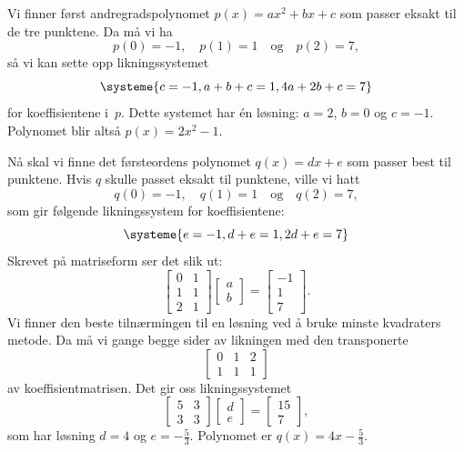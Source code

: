 \documentclass[notitlepage,a4paper,12pt,norsk]{IMFeksamen}
\newcommand{\0}{\V{0}}
\newcommand{\oppgslutt}{
\begin{center}
\pgfornament[width=6cm]{88}
\end{center}
}
\newenvironment{losning}{\begin{oppgave}}{\oppgslutt\end{oppgave}}
\begin{document}
\begin{losning}
Vi finner først andregradspolynomet
$p(x)=ax^2+bx+c$
som passer eksakt til de tre punktene.
Da må vi ha
\[
p(0) = -1,\quad
p(1) = 1\quad
\text{og}\quad
p(2) = 7,
\]
så vi kan sette opp likningssystemet
\[
\systeme{
c=-1,
a+b+c=1,
4a+2b+c=7
}
\]
for koeffisientene i~$p$.
Dette systemet har én løsning: $a=2$, $b=0$ og $c=-1$.
Polynomet blir altså $p(x) = 2x^2 - 1$. 

Nå skal vi finne det førsteordens polynomet
$q(x) = dx + e$
som passer best til punktene.
Hvis $q$ skulle passet eksakt til punktene, ville vi hatt
\[
q(0) = -1,\quad
q(1) = 1\quad
\text{og}\quad
q(2) = 7,
\]
som gir følgende likningssystem for koeffisientene:
\[
\systeme{
e=-1,
d+e=1,
2d+e=7
}
\]
Skrevet på matriseform ser det slik ut:
\[
\begin{bmatrix}
0 & 1  \\
1 & 1  \\
2 & 1 
\end{bmatrix}
\begin{bmatrix}
a  \\
b 
\end{bmatrix}
=
\begin{bmatrix}
-1  \\
1  \\
7
\end{bmatrix}.
\]
Vi finner den beste tilnærmingen til en løsning ved å bruke
minste kvadraters metode.
Da må vi gange begge sider av likningen med den transponerte
\[
\begin{bmatrix}
0 & 1 & 2 \\
1 & 1 & 1
\end{bmatrix}
\]
av koeffisientmatrisen.  Det gir oss likningssystemet
\[
\begin{bmatrix}
5 & 3  \\
3 & 3 
\end{bmatrix}
\begin{bmatrix}
d  \\
e 
\end{bmatrix}
=
\begin{bmatrix}
15  \\
7
\end{bmatrix},
\]
som har løsning $d=4$ og $e=-\frac{5}{3}$. Polynomet er $q(x) = 4x - \frac{5}{3}$.
\begin{center}
\end{center}
\end{losning}
\end{document}
